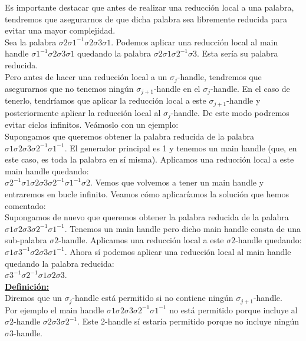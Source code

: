 Es importante destacar que antes de realizar una reducción local a una palabra, tendremos que asegurarnos de que dicha palabra sea libremente reducida para evitar una mayor complejidad.\\

Sea la palabra $\sigma2\sigma1^{-1}\sigma2\sigma3\sigma1$. Podemos aplicar una reducción local al main handle $\sigma1^{-1}\sigma2\sigma3\sigma1$ quedando la palabra $\sigma2\sigma1\sigma2^{-1}\sigma3$. Esta sería su palabra reducida.\\

Pero antes de hacer una reducción local a un $\sigma_{j}$-handle, tendremos que asegurarnos que no tenemos ningún $\sigma_{j+1}$-handle en el $\sigma_{j}$-handle. En el caso de tenerlo, tendríamos que aplicar la reducción local a este $\sigma_{j+1}$-handle y posteriormente aplicar la reducción local al $\sigma_{j}$-handle. De este modo podremos evitar ciclos infinitos. Veámoslo con un ejemplo:\\

Supongamos que queremos obtener la palabra reducida de la palabra $\sigma1\sigma2\sigma3\sigma2^{-1}\sigma1^{-1}$. El generador principal es 1 y tenemos un main handle (que, en este caso, es toda la palabra en sí misma). Aplicamos una reducción local a este main handle quedando: \\
$\sigma2^{-1}\sigma1\sigma2\sigma3\sigma2^{-1}\sigma1^{-1}\sigma2$.
Vemos que volvemos a tener un main handle y entraremos en bucle infinito. Veamos cómo aplicaríamos la solución que hemos comentado:\\

Supongamos de nuevo que queremos obtener la palabra reducida de la palabra $\sigma1\sigma2\sigma3\sigma2^{-1}\sigma1^{-1}$. Tenemos un main handle pero dicho main handle consta de una sub-palabra $\sigma2$-handle. Aplicamos una reducción local a este $\sigma2$-handle quedando:\\
$\sigma1\sigma3^{-1}\sigma2\sigma3\sigma1^{-1}$. Ahora sí podemos aplicar una reducción local al main handle quedando la palabra reducida: \\
$\sigma3^{-1}\sigma2^{-1}\sigma1\sigma2\sigma3$.\\

\underline{\textbf{Definición:}} \\
Diremos que un  $\sigma_{j}$-handle está permitido si no contiene ningún $\sigma_{j+1}$-handle.\\

Por ejemplo el main handle $\sigma1\sigma2\sigma3\sigma2^{-1}\sigma1^{-1}$ no está permitido porque incluye al $\sigma2$-handle $\sigma2\sigma3\sigma2^{-1}$. Este 2-handle sí estaría permitido porque no incluye ningún $\sigma3$-handle. \\

